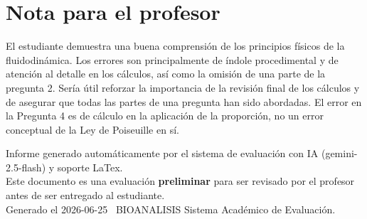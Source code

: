 \documentclass[11pt,a4paper]{article}
\begin{document}
\section*{Nota para el profesor}
\begin{tcolorbox}[
  enhanced, breakable,
  colback=yellow!8, colframe=yellow!60!black,
  fonttitle=\bfseries, coltitle=black,
  title={Observaciones para revisión manual},
  top=4pt, bottom=4pt, left=8pt, right=8pt,
]
El estudiante demuestra una buena comprensión de los principios físicos de la fluidodinámica. Los errores son principalmente de índole procedimental y de atención al detalle en los cálculos, así como la omisión de una parte de la pregunta 2. Sería útil reforzar la importancia de la revisión final de los cálculos y de asegurar que todas las partes de una pregunta han sido abordadas. El error en la Pregunta 4 es de cálculo en la aplicación de la proporción, no un error conceptual de la Ley de Poiseuille en sí.
\end{tcolorbox}

\vspace{12pt}
\begin{center}
  \footnotesize\color{gray}
  Informe generado automáticamente por el sistema de evaluación con IA (gemini-2.5-flash) y soporte LaTex. \\
  Este documento es una evaluación \textbf{preliminar} para ser revisado por el profesor antes de ser entregado al 
  estudiante. \\
  Generado el 2026-06-25 \textbullet\ BIOANALISIS Sistema Académico de Evaluación.
  \end{center}
\end{document}

